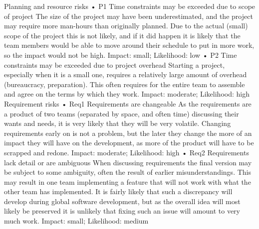 Planning and resource risks
•	P1 Time constraints may be exceeded due to scope of project
The size of the project may have been underestimated, and the project may require more man-hours than originally planned. Due to the actual (small) scope of the project this is not likely, and if it did happen it is likely that the team members would be able to move around their schedule to put in more work, so the impact would not be high.
Impact: small; Likelihood: low
•	P2 Time constraints may be exceeded due to project overhead
Starting a project, especially when it is a small one, requires a relatively large amount of overhead (bureaucracy, preparation). This often requires for the entire team to assemble and agree on the terms by which they work.
Impact: moderate; Likelihood: high
Requirement risks
•	Req1 Requirements are changeable 
As the requirements are a product of two teams (separated by space, and often time) discussing their wants and needs, it is very likely that they will be very volatile. Changing requirements early on is not a problem, but the later they change the more of an impact they will have on the development, as more of the product will have to be scrapped and redone.
Impact: moderate; Likelihood: high
•	Req2 Requirements lack detail or are ambiguous
When discussing requirements the final version may be subject to some ambiguity, often the result of earlier misunderstandings. This may result in one team implementing a feature that will not work with what the other team has implemented. It is fairly likely that such a discrepancy will develop during global software development, but as the overall idea will most likely be preserved it is unlikely that fixing such an issue will amount to very much work.
Impact: small; Likelihood: medium
